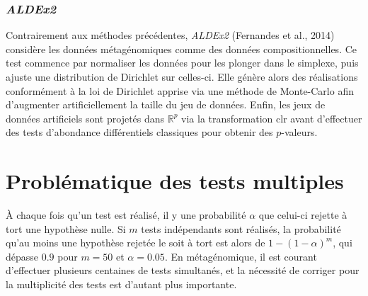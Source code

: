\documentclass[12pt,a4paper]{reedthesis}
\newcommand \RR {\mathbb{R}}
\theoremstyle{definition}
\theoremstyle{definition}
\theoremstyle{definition}
\theoremstyle{remark}
\begin{document}
\hypertarget{aldex2}{%
\subsubsection*{\texorpdfstring{\emph{ALDEx2}}{ALDEx2}}\label{aldex2}}

Contrairement aux méthodes précédentes, \emph{ALDEx2} (Fernandes et al., 2014) considère les données métagénomiques comme des données compositionnelles. Ce test commence par normaliser les données pour les plonger dans le simplexe, puis ajuste une distribution de Dirichlet sur celles-ci. Elle génère alors des réalisations conformément à la loi de Dirichlet apprise via une méthode de Monte-Carlo afin d'augmenter artificiellement la taille du jeu de données. Enfin, les jeux de données artificiels sont projetés dans \(\RR^p\) via la transformation \(\text{clr}\) avant d'effectuer des tests d'abondance différentiels classiques pour obtenir des \(p\)-valeurs.

\hypertarget{probluxe9matique-des-tests-multiples}{%
\section{Problématique des tests multiples}\label{probluxe9matique-des-tests-multiples}}

À chaque fois qu'un test est réalisé, il y une probabilité \(\alpha\) que celui-ci rejette à tort une hypothèse nulle. Si \(m\) tests indépendants sont réalisés, la probabilité qu'au moins une hypothèse rejetée le soit à tort est alors de \(1-(1-\alpha)^m\), qui dépasse \(0.9\) pour \(m = 50\) et \(\alpha = 0.05\). En métagénomique, il est courant d'effectuer plusieurs centaines de tests simultanés, et la nécessité de corriger pour la multiplicité des tests est d'autant plus importante.
\end{document}
